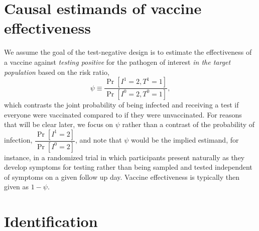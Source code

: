 \documentclass[11pt]{article}
\begin{document}
\section{Causal estimands of vaccine effectiveness}
We assume the goal of the test-negative design is to estimate the effectiveness of a vaccine against \textit{testing positive} for the pathogen of interest \textit{in the target population} based on the risk ratio,
\begin{equation*}
    \psi \equiv \dfrac{\Pr[I^1 = 2, T^1 = 1]}{\Pr[I^0 = 2, T^0 = 1]},
\end{equation*}
which contrasts the joint probability of being infected and receiving a test if everyone were vaccinated compared to if they were unvaccinated. For reasons that will be clear later, we focus on $\psi$ rather than a contrast of the probability of infection, $\dfrac{\Pr[I^1 = 2]}{\Pr[I^0 = 2]}$, and note that $\psi$ would be the implied estimand, for instance, in a randomized trial in which participants present naturally as they develop symptoms for testing rather than being sampled and tested independent of symptoms on a given follow up day. Vaccine effectiveness is typically then given as $1 - \psi$.


\section{Identification} \label{sec:identification}
\end{document}
